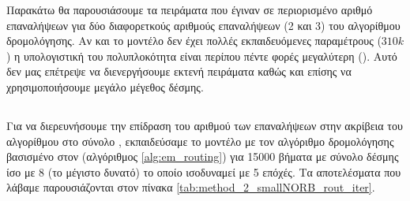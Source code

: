 Παρακάτω θα παρουσιάσουμε τα πειράματα που έγιναν σε περιορισμένο αριθμό επαναλήψεων για δύο διαφορετκούς αριθμούς επαναλήψεων (2 και 3) του αλγορίθμου δρομολόγησης. Αν και το μοντέλο δεν έχει πολλές εκπαιδευόμενες παραμέτρους ($310k$) η υπολογιστική του πολυπλοκότητα είναι περίπου πέντε φορές μεγαλύτερη (). Αυτό δεν μας επέτρεψε να διενεργήσουμε εκτενή πειράματα καθώς και επίσης να χρησιμοποιήσουμε μεγάλο μέγεθος δέσμης.

\subsection{}
Για να διερευνήσουμε την επίδραση του αριθμού των επαναλήψεων στην ακρίβεια του αλγορίθμου στο σύνολο , εκπαιδεύσαμε το μοντέλο με τον αλγόριθμο δρομολόγησης βασισμένο στον  (αλγόριθμος \ref{alg:em_routing}) για 15000 βήματα με σύνολο δέσμης ίσο με 8 (το μέγιστο δυνατό) το οποίο ισοδυναμεί με 5 επόχές. Τα αποτελέσματα που λάβαμε παρουσιάζονται στον πίνακα \ref{tab:method_2_smallNORB_rout_iter}.
\begin{table}[h]
    \begin{center}
    \end{center}
    \caption[]{\label{tab:method_2_smallNORB_rout_iter}Πίνακας στον οποίο φαίνεται η επίδραση του αριθμού των επαναλήψεων στην ακρίβεια όπως μετράται από το σύνολο ελέγχου , όταν χρησιμοποιούνται πολύ λίγες εποχές για την εκπαίδευση του μοντέλου.} 
\end{table}

